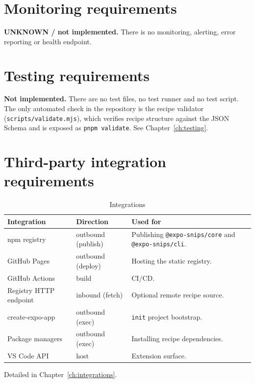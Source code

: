 \section{Monitoring requirements}

\textbf{UNKNOWN / not implemented.} There is no monitoring, alerting, error
reporting or health endpoint.

\section{Testing requirements}

\textbf{Not implemented.} There are no test files, no test runner and no test
script. The only automated check in the repository is the recipe validator
(\texttt{scripts/validate.mjs}), which verifies recipe structure against the JSON
Schema and is exposed as \texttt{pnpm validate}. See Chapter~\ref{ch:testing}.

\section{Third-party integration requirements}

\begin{longtable}{p{4.4cm}p{5.2cm}p{4.8cm}}
\caption{Integrations}\\
\toprule
\textbf{Integration} & \textbf{Direction} & \textbf{Used for} \\
\midrule

npm registry & outbound (publish) & Publishing \texttt{@expo-snips/core} and \texttt{@expo-snips/cli}. \\
GitHub Pages & outbound (deploy) & Hosting the static registry. \\
GitHub Actions & build & CI/CD. \\
Registry HTTP endpoint & inbound (fetch) & Optional remote recipe source. \\
create-expo-app & outbound (exec) & \texttt{init} project bootstrap. \\
Package managers & outbound (exec) & Installing recipe dependencies. \\
VS Code API & host & Extension surface. \\
\bottomrule
\end{longtable}

Detailed in Chapter~\ref{ch:integrations}.
